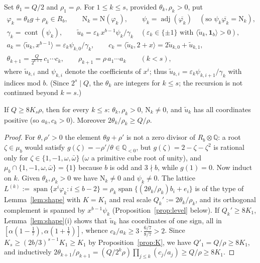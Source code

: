 \documentclass[12pt]{article}
\newcommand{\Q}{\mathbb{Q}}
\newcommand{\cont}{\operatorname{cont}}
\newcommand{\adj}{\operatorname{adj}}
\newcommand{\Nm}{\mathrm{N}}
\newcommand{\one}{\mathbf{1}}
\newcommand{\gpoly}{g}
\begin{document}
\begin{definition}\label{def:levels}
Set $\theta_1=Q/2$ and $\rho_1=\rho$. For $1\le k\le s$, provided $\theta_k,\rho_k>0$, put
\begin{gather*}
\varphi_k=\theta_k\gpoly+\rho_k\in R_b,\qquad \Nm_k=\Nm(\varphi_k),\qquad
\psi_k=\adj(\overline{\varphi_k})\quad(\text{so }\psi_k\overline{\varphi_k}=\Nm_k),\\
\gamma_k=\cont(\psi_k),\qquad \tilde u_k=\varepsilon_k\,x^{b-1}\psi_k/\gamma_k\quad
(\varepsilon_k\in\{\pm1\}\text{ with }\langle\tilde u_k,\one_b\rangle>0),\\
a_k=\langle\tilde u_k,x^{b-1}\rangle=\varepsilon_k\psi_{k,0}/\gamma_k,\qquad
c_k=\langle\tilde u_k,2+x\rangle=2\tilde u_{k,0}+\tilde u_{k,1},\\
\theta_{k+1}=\frac{Q}{2^{k+1}}\,c_1\cdots c_k,\qquad \rho_{k+1}=\rho\,a_1\cdots a_k\qquad(k<s),
\end{gather*}
where $\tilde u_{k,i}$ and $\psi_{k,i}$ denote the coefficients of $x^i$; thus $\tilde u_{k,i}=\varepsilon_k\psi_{k,i+1}/\gamma_k$
with indices mod $b$. (Since $2^s\mid Q$, the $\theta_k$ are integers for $k\le s$; the recursion is not continued beyond $k=s$.)
\end{definition}

\begin{lemma}\label{lem:nondeg}
If $Q\ge8K_s\rho$, then for every $k\le s$: $\theta_k,\rho_k>0$, $\Nm_k\ne0$, and $\tilde u_k$ has all coordinates
positive (so $a_k,c_k>0$). Moreover $2\theta_k/\rho_k\ge Q/\rho$.
\end{lemma}
\begin{proof}
For $\theta,\rho'>0$ the element $\theta\gpoly+\rho'$ is not a zero divisor of $R_b\otimes\Q$: a root $\zeta\in\mu_b$ would
satisfy $\gpoly(\zeta)=-\rho'/\theta\in\Q_{<0}$, but $\gpoly(\zeta)=2-\zeta-\zeta^2$ is rational only for
$\zeta\in\{1,-1,\omega,\bar\omega\}$ ($\omega$ a primitive cube root of unity), and
$\mu_b\cap\{1,-1,\omega,\bar\omega\}=\{1\}$ because $b$ is odd and $3\nmid b$, while $\gpoly(1)=0$.
Now induct on $k$. Given $\theta_k,\rho_k>0$ we have $\Nm_k\ne0$ and $\psi_k\ne0$. The lattice
$L^{(k)}:=\operatorname{span}\{x^i\varphi_k:i\le b-2\}=\rho_k\operatorname{span}\{(2\theta_k/\rho_k)b_i+e_i\}$ is of the type
of Lemma~\ref{lem:shape} with $K=K_1$ and real scale $Q_k':=2\theta_k/\rho_k$, and its orthogonal complement is spanned
by $x^{b-1}\psi_k$ (Proposition~\ref{prop:level} below). If $Q_k'\ge8K_1$, Lemma~\ref{lem:shape}(i) shows that
$\tilde u_k$ has coordinates of one sign, all in $[\alpha(1-\frac17),\alpha(1+\frac17)]$, whence
$c_k/a_k\ge3\cdot\frac{6/7}{8/7}>2$. Since $K_s\ge(2b/3)^{s-1}K_1\ge K_1$ by Proposition~\ref{prop:K}, we have
$Q'_1=Q/\rho\ge8K_1$, and inductively $2\theta_{k+1}/\rho_{k+1}=(Q/2^{k}\rho)\prod_{j\le k}(c_j/a_j)\ge Q/\rho\ge8K_1$.
\end{proof}
\end{document}
